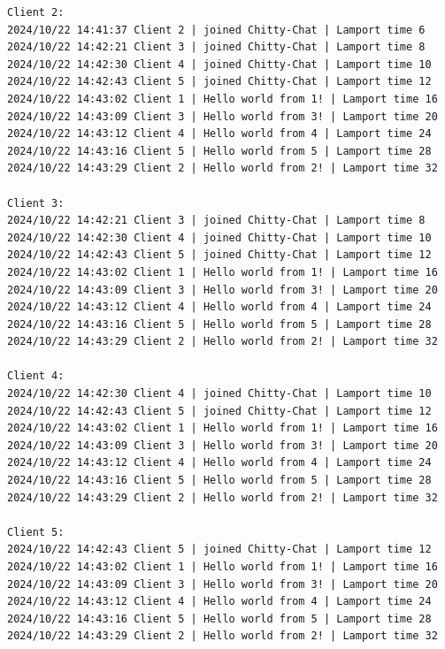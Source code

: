 \documentclass[a4paper,11pt]{article}
\begin{document}
\begin{lstlisting}[basicstyle=\ttfamily\footnotesize]
Client 2:
2024/10/22 14:41:37 Client 2 | joined Chitty-Chat | Lamport time 6
2024/10/22 14:42:21 Client 3 | joined Chitty-Chat | Lamport time 8
2024/10/22 14:42:30 Client 4 | joined Chitty-Chat | Lamport time 10
2024/10/22 14:42:43 Client 5 | joined Chitty-Chat | Lamport time 12
2024/10/22 14:43:02 Client 1 | Hello world from 1! | Lamport time 16
2024/10/22 14:43:09 Client 3 | Hello world from 3! | Lamport time 20
2024/10/22 14:43:12 Client 4 | Hello world from 4 | Lamport time 24
2024/10/22 14:43:16 Client 5 | Hello world from 5 | Lamport time 28
2024/10/22 14:43:29 Client 2 | Hello world from 2! | Lamport time 32

Client 3:
2024/10/22 14:42:21 Client 3 | joined Chitty-Chat | Lamport time 8
2024/10/22 14:42:30 Client 4 | joined Chitty-Chat | Lamport time 10
2024/10/22 14:42:43 Client 5 | joined Chitty-Chat | Lamport time 12
2024/10/22 14:43:02 Client 1 | Hello world from 1! | Lamport time 16
2024/10/22 14:43:09 Client 3 | Hello world from 3! | Lamport time 20
2024/10/22 14:43:12 Client 4 | Hello world from 4 | Lamport time 24
2024/10/22 14:43:16 Client 5 | Hello world from 5 | Lamport time 28
2024/10/22 14:43:29 Client 2 | Hello world from 2! | Lamport time 32

Client 4:
2024/10/22 14:42:30 Client 4 | joined Chitty-Chat | Lamport time 10
2024/10/22 14:42:43 Client 5 | joined Chitty-Chat | Lamport time 12
2024/10/22 14:43:02 Client 1 | Hello world from 1! | Lamport time 16
2024/10/22 14:43:09 Client 3 | Hello world from 3! | Lamport time 20
2024/10/22 14:43:12 Client 4 | Hello world from 4 | Lamport time 24
2024/10/22 14:43:16 Client 5 | Hello world from 5 | Lamport time 28
2024/10/22 14:43:29 Client 2 | Hello world from 2! | Lamport time 32

Client 5:
2024/10/22 14:42:43 Client 5 | joined Chitty-Chat | Lamport time 12
2024/10/22 14:43:02 Client 1 | Hello world from 1! | Lamport time 16
2024/10/22 14:43:09 Client 3 | Hello world from 3! | Lamport time 20
2024/10/22 14:43:12 Client 4 | Hello world from 4 | Lamport time 24
2024/10/22 14:43:16 Client 5 | Hello world from 5 | Lamport time 28
2024/10/22 14:43:29 Client 2 | Hello world from 2! | Lamport time 32
\end{lstlisting}
\end{document}
